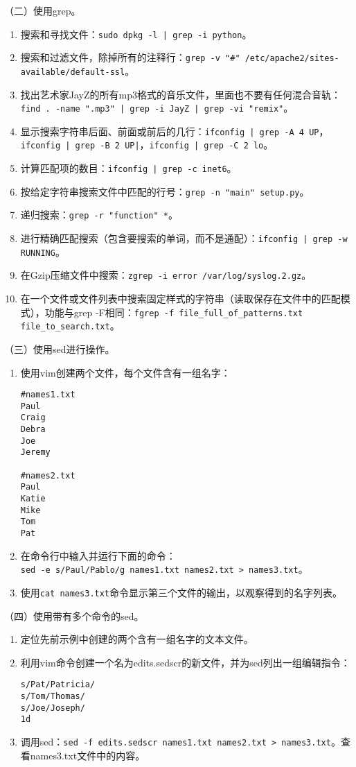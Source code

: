 \vspace{0.1in}
（二）使用grep。
\begin{enumerate}
  \item 搜索和寻找文件：\verb=sudo dpkg -l | grep -i python=。
  \item 搜索和过滤文件，除掉所有的注释行：\verb|grep -v "#" /etc/apache2/sites-available/default-ssl|。
  \item 找出艺术家JayZ的所有mp3格式的音乐文件，里面也不要有任何混合音轨：\verb=find . -name ".mp3" | grep -i JayZ | grep -vi "remix"=。
  \item 显示搜索字符串后面、前面或前后的几行：\verb=ifconfig | grep -A 4 UP=，\verb=ifconfig | grep -B 2 UP|=，\verb=ifconfig | grep -C 2 lo=。
  \item 计算匹配项的数目：\verb=ifconfig | grep -c inet6=。
  \item 按给定字符串搜索文件中匹配的行号：\verb|grep -n "main" setup.py|。
  \item 递归搜索：\verb|grep -r "function" *|。
  \item 进行精确匹配搜索（包含要搜索的单词，而不是通配）：\verb=ifconfig | grep -w RUNNING=。
  \item 在Gzip压缩文件中搜索：\verb|zgrep -i error /var/log/syslog.2.gz|。
  \item 在一个文件或文件列表中搜索固定样式的字符串（读取保存在文件中的匹配模式），功能与grep -F相同：\verb|fgrep -f file_full_of_patterns.txt file_to_search.txt|。
\end{enumerate}

\vspace{0.1in}
（三）使用sed进行操作。
\begin{enumerate}
  \item 使用vim创建两个文件，每个文件含有一组名字：
\begin{verbatim}
#names1.txt
Paul
Craig
Debra
Joe
Jeremy

#names2.txt
Paul
Katie
Mike
Tom
Pat
\end{verbatim}
  \item 在命令行中输入并运行下面的命令：\\ \verb|sed -e s/Paul/Pablo/g names1.txt names2.txt > names3.txt|。
  \item 使用\verb|cat names3.txt|命令显示第三个文件的输出，以观察得到的名字列表。
\end{enumerate}

\vspace{0.1in}
（四）使用带有多个命令的sed。
\begin{enumerate}
  \item 定位先前示例中创建的两个含有一组名字的文本文件。
  \item 利用vim命令创建一个名为edits.sedscr的新文件，并为sed列出一组编辑指令：
\begin{verbatim}
s/Pat/Patricia/
s/Tom/Thomas/
s/Joe/Joseph/
1d
\end{verbatim}
  \item 调用sed：\verb|sed -f edits.sedscr names1.txt names2.txt > names3.txt|。查看names3.txt文件中的内容。
\end{enumerate}

